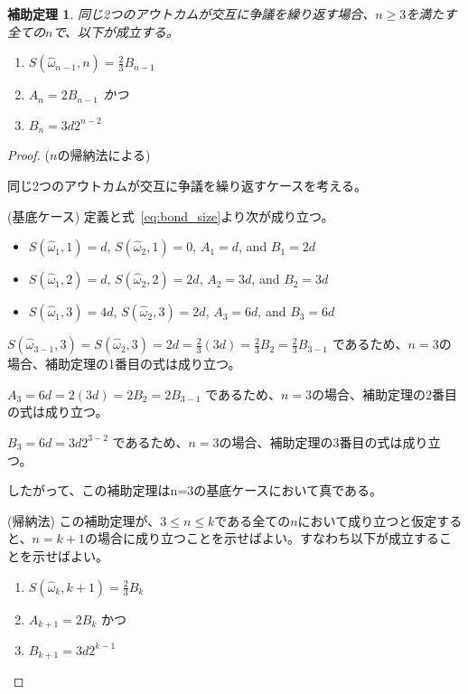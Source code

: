 \documentclass[floatfix,reprint,nofootinbib,amsmath,amssymb,epsfig,pre,floats,letterpaper,groupedaffiliation]{revtex4-1}
\newtheorem{lemma}[theorem]{補助定理}
\theoremstyle{definition}
\theoremstyle{definition}
\theoremstyle{definition}
\begin{document}
\begin{appendix}
\begin{lemma}\label{le:bond_sizes}
同じ2つのアウトカムが交互に争議を繰り返す場合、$n \geq 3$を満たす全ての$n$で、以下が成立する。
\begin{enumerate}
\item{$S(\hat{\omega}_{n-1},n)=\frac{2}{3}B_{n-1}$}
\item{$A_{n} = 2B_{n-1}$ かつ}
\item{$B_{n} = 3d2^{n-2}$}
\end{enumerate}
\end{lemma}

\begin{proof}
($n$の帰納法による)

同じ2つのアウトカムが交互に争議を繰り返すケースを考える。


(基底ケース)
定義と式~\ref{eq:bond_size}より次が成り立つ。

\begin{itemize}
\item{$S(\hat{\omega}_{1},1)=d$, $S(\hat{\omega}_{2},1)=0$, $A_{1}=d$, and $B_{1}=2d$}
\item{$S(\hat{\omega}_{1},2)=d$, $S(\hat{\omega}_{2},2)=2d$, $A_{2}=3d$, and $B_{2}=3d$}
\item{$S(\hat{\omega}_{1},3)=4d$, $S(\hat{\omega}_{2},3)=2d$, $A_{3}=6d$, and $B_{3}=6d$}
\end{itemize}

$S(\hat{\omega}_{3-1},3)=S(\hat{\omega}_{2},3)=2d=\frac{2}{3}(3d)=\frac{2}{3}B_{2}=\frac{2}{3}B_{3-1}$ であるため、$n=3$の場合、補助定理の1番目の式は成り立つ。

$A_{3}=6d=2(3d)=2B_{2}=2B_{3-1}$ であるため、$n=3$の場合、補助定理の2番目の式は成り立つ。

$B_{3}=6d=3d2^{3-2}$ であるため、$n=3$の場合、補助定理の3番目の式は成り立つ。

\vspace{4mm}

したがって、この補助定理はn=3の基底ケースにおいて真である。

\vspace{4mm}

(帰納法)
この補助定理が、$3 \leq n \leq k$である全ての$n$において成り立つと仮定すると、$n=k+1$の場合に成り立つことを示せばよい。すなわち以下が成立することを示せばよい。

\begin{enumerate}[label=(\alph*)]
\item{$S(\hat{\omega}_{k},k+1)=\frac{2}{3}B_{k}$}
\item{$A_{k+1}=2B_{k}$ かつ}
\item{$B_{k+1}=3d2^{k-1}$}
\end{enumerate}



\end{proof}
\end{appendix}
\end{document}
